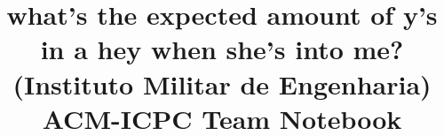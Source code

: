 \documentclass[a4paper,10pt]{article}
\title{\vspace{-4ex}\Large{what's the expected amount of y's in a hey when she's into me? (Instituto Militar de Engenharia) ACM-ICPC Team Notebook}}
\author{}
\date{}
\begin{document}
\begin{landscape}
\begin{multicols}{3}

\maketitle
\vspace{-13ex}
\tableofcontents
\pagestyle{fancy}




\end{multicols}

\end{landscape}
\end{document}
